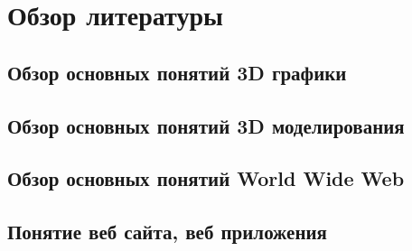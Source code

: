 \section{Обзор литературы}
\label{sec:domain}

\subsection{Обзор основных понятий 3D графики}
\label{sub:domain:overview_3d}


\subsection{Обзор основных понятий 3D моделирования}
\label{sub:domain:overview_3d_modelling}


\subsection{Обзор основных понятий World Wide Web}
\label{sub:domain:overview_www}


\subsection{Понятие веб сайта, веб приложения}
\label{sub:domain:overview_website}


